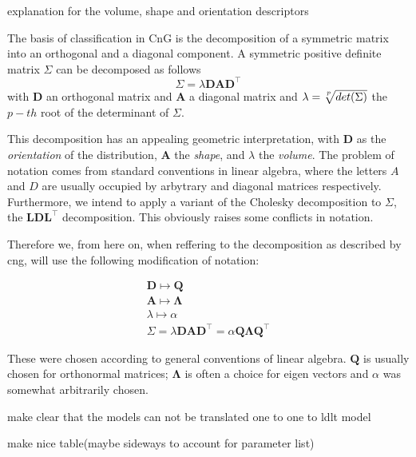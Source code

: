 explanation for the volume, shape and orientation descriptors

The basis of classification in CnG is the decomposition of a symmetric matrix into
an orthogonal and a diagonal component.
A symmetric positive definite matrix $ \Sigma $ can be decomposed as follows
\[ \Sigma = \lambda \pmb{D} \pmb{A} \pmb{D}^{\top} \]
with $ \pmb{D} $ an orthogonal matrix and $ \pmb{A} $ a diagonal matrix and 
$ \lambda = \sqrt[\uproot{3}p]{det(\Sigma)} $ the $ p-th $ root of the determinant 
of $ \Sigma $.

This decomposition has an appealing geometric interpretation, with $ \pmb{D} $ 
as the \textit{orientation} of the distribution, $ \pmb{A} $ the \textit{shape}, and $ \lambda $
the \textit{volume}.
The problem of notation comes from standard conventions in linear algebra, where
the letters $A$ and $D$ are usually occupied by arbytrary and diagonal matrices 
respectively. Furthermore, we intend to apply a variant of the Cholesky decomposition
to $ \Sigma $, the $ \pmb{L}\pmb{D}\pmb{L}^{\top} $ decomposition.
This obviously raises some conflicts in notation.

Therefore we, from here on, when reffering to the decomposition as described
by cng, will use the following modification of notation:

\begin{align*} 
    \pmb{D} \longmapsto \pmb{Q} \\
    \pmb{A} \longmapsto \pmb{\Lambda} \\
    \lambda \longmapsto \alpha  \\
    \Sigma = \lambda \pmb{D} \pmb{A} \pmb{D}^{\top} =
        \alpha \pmb{Q} \pmb{\Lambda} \pmb{Q}^{\top}
\end{align*}

These were chosen according to general conventions of linear algebra.
$ \pmb{Q} $ is usually chosen for orthonormal matrices; $ \pmb{\Lambda} $ is 
often a choice for eigen vectors and $ \alpha $ was somewhat arbitrarily chosen.


make clear that the models can not be translated one to one to ldlt model

make nice table(maybe sideways to account for parameter list)


